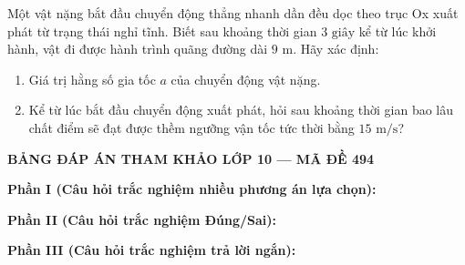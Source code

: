 	\begin{ex}%
		Một vật nặng bắt đầu chuyển động thẳng nhanh dần đều dọc theo trục Ox xuất phát từ trạng thái nghỉ tĩnh. Biết sau khoảng thời gian $3\text{ giây}$ kể từ lúc khởi hành, vật đi được hành trình quãng đường dài $9\text{ m}$. Hãy xác định:
		\begin{enumerate}
			\item[a.] Giá trị hằng số gia tốc $a$ của chuyển động vật nặng.
			\item[b.] Kể từ lúc bắt đầu chuyển động xuất phát, hỏi sau khoảng thời gian bao lâu chất điểm sẽ đạt được thềm ngưỡng vận tốc tức thời bằng $15\text{ m/s}$?
		\end{enumerate}
	\end{ex}
	
	
	\newpage
	\begin{center} \textbf{BẢNG ĐÁP ÁN THAM KHẢO LỚP 10 --- MÃ ĐỀ 494} \end{center}
	
	\noindent \textbf{Phần I (Câu hỏi trắc nghiệm nhiều phương án lựa chọn):}  
	
	\noindent \textbf{Phần II (Câu hỏi trắc nghiệm Đúng/Sai):}
	
	\noindent \textbf{Phần III (Câu hỏi trắc nghiệm trả lời ngắn):}
	
	\label{B\thedeso}